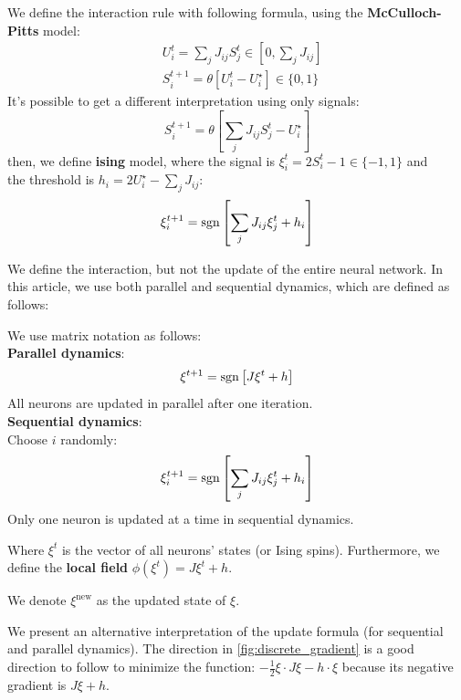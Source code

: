 \begin{definition}[interaction] We define the interaction rule with following formula, using the \textbf{McCulloch-Pitts} model:
    \begin{align}
        & U_i^t = \sum_j J_{ij}S_j^t \in \left[0, \sum_j J_{ij}\right]\\
        & S_i^{t+1} = \theta \left[U_i^t - U_i^\star\right] \in \{0,1\}
    \end{align}
    It's possible to get a different interpretation using only signals:
    \[
        S_i^{t+1} = \theta \left[\sum_j J_{ij}S_j^t - U_i^\star\right]
    \]
    then, we define \textbf{ising} model, where the signal is $\xi_i^t = 2S_i^t-1\in\{-1,1\}$ and \\
    the threshold is $h_i = 2U_i^\star - \sum_j J_{ij}$:
    \begin{equation}
        \xi_i^{t+1} = \operatorname{sgn} \left[\sum_j J_{ij}\xi_j^{t} + h_i\right]
    \end{equation}
\end{definition}

\bigskip\noindent We define the interaction, but not the update of the entire neural network. In this article, we use both parallel and sequential dynamics, which are defined as follows:
\begin{definition}[updating] \label{def:discupdating} We use matrix notation as follows:\\
\textbf{Parallel dynamics}:
    \[
        \xi^{t+1} = \operatorname{sgn}\left[J\xi^t+h\right]
    \]
     All neurons are updated in parallel after one iteration.\\
\textbf{Sequential dynamics}:\\
Choose $i$ randomly:
     \[
        \xi_i^{t+1} = \operatorname{sgn} \left[\sum_j J_{ij}\xi_j^{t} + h_i\right]
    \]
    Only one neuron is updated at a time in sequential dynamics.

    \bigskip \noindent Where $\xi^t$ is the vector of all neurons' states (or Ising spins). Furthermore, we define the \textbf{local field} $\phi\left(\xi^t\right) = J\xi^t+h$.

    \noindent We denote $\xi^{\text{new}}$ as the updated state of $\xi$.
\end{definition}

\begin{remark}
    We present an alternative interpretation of the update formula (for sequential and parallel dynamics). The direction in \cref{fig:discrete_gradient} is a good direction to follow to minimize the function: $-\frac12\xi\cdot J\xi - h\cdot\xi$ because its negative gradient is $J\xi+h$.
\end{remark}

